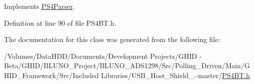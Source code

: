 \-Implements \hyperlink{class_p_s4_parser_a8788530b0c213dedfcf56b78e8ca4879}{\-P\-S4\-Parser}.



\-Definition at line 90 of file \-P\-S4\-B\-T.\-h.



\-The documentation for this class was generated from the following file\-:\begin{DoxyCompactItemize}
\item 
/\-Volumes/\-Data\-H\-D\-D/\-Documents/\-Development Projects/\-G\-H\-I\-D -\/ Beta/\-G\-H\-I\-D/\-B\-L\-U\-N\-O\-\_\-\-Project/\-B\-L\-U\-N\-O\-\_\-\-A\-D\-S1298/\-Src/\-Polling\-\_\-\-Driven/\-Main/\-G\-H\-I\-D\-\_\-\-Framework/\-Src/\-Included Libraries/\-U\-S\-B\-\_\-\-Host\-\_\-\-Shield\-\_.-\/master/\hyperlink{_p_s4_b_t_8h}{\-P\-S4\-B\-T.\-h}\end{DoxyCompactItemize}
